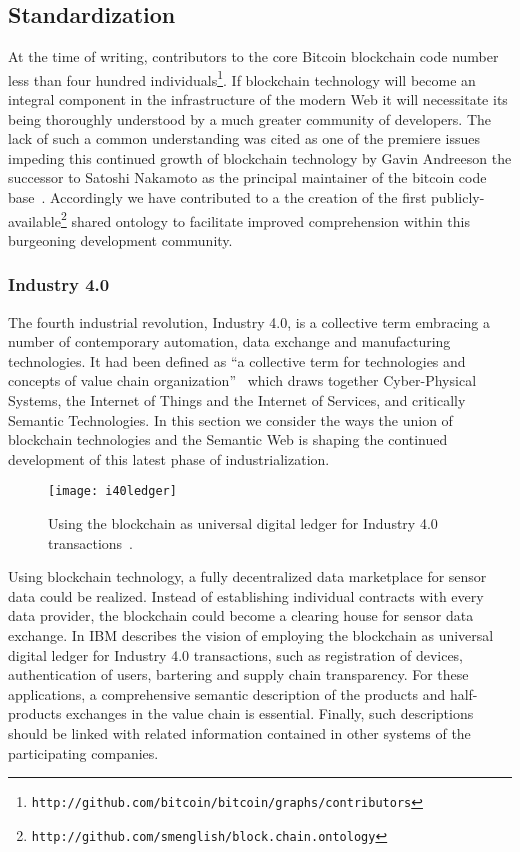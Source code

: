 \subsection{Standardization}

At the time of writing, contributors to the core Bitcoin blockchain code number less than four hundred individuals\footnote{\footnotesize{\texttt{http://github.com/bitcoin/bitcoin/graphs/contributors}}}.
If blockchain technology will become an integral component in the infrastructure of the modern Web it will necessitate its being thoroughly understood by a much greater community of developers. 
The lack of such a common understanding was cited as one of the premiere issues impeding this continued growth of blockchain technology by Gavin Andreeson the successor to Satoshi Nakamoto as the principal maintainer of the bitcoin code base~\cite{jonmatonis2012}.
Accordingly we have contributed to a the creation of the first publicly-available\footnote{\footnotesize{\texttt{http://github.com/smenglish/block.chain.ontology}}} shared ontology to facilitate improved comprehension within this burgeoning development community.

\subsubsection{Industry 4.0}

The fourth industrial revolution, Industry 4.0, is a collective term embracing a number of contemporary automation, data exchange and manufacturing technologies. It had been defined as ``a collective term for technologies and concepts of value chain organization''~\cite{nirjargandhi2015} which draws together Cyber-Physical Systems, the Internet of Things and the Internet of Services, and critically Semantic Technologies. In this section we consider the ways the union of blockchain technologies and the Semantic Web is shaping the continued development of this latest phase of industrialization. 

\begin{figure}[tb]
   \center 
   \texttt{[image: i40ledger]}
   \caption{Using the blockchain as universal digital ledger for Industry 4.0 transactions~\cite{DeviceDemocracy}.} 
   \label{fig:passport}
\end{figure} 

Using blockchain technology, a fully decentralized data marketplace for sensor data could be realized. Instead of establishing individual contracts with every data provider, the blockchain could become a clearing house for sensor data exchange. In \cite{DeviceDemocracy} IBM describes the vision of employing the blockchain as universal digital  ledger for Industry 4.0  transactions, such as registration of devices, authentication of users, bartering and supply chain transparency. For these applications, a comprehensive semantic description of the products and half-products exchanges in the value chain is essential. Finally, such descriptions should be linked with related information contained in other systems of the participating companies.

